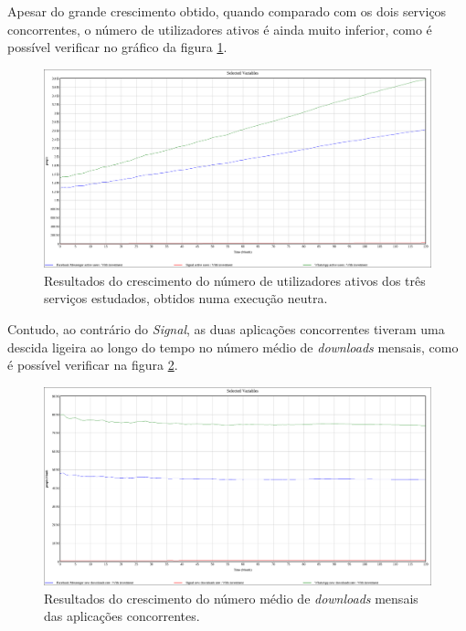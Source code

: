 Apesar do grande crescimento obtido, quando comparado com os dois serviços concorrentes, o número de utilizadores ativos é ainda muito inferior, como é possível verificar no gráfico da figura \ref{model:base_all_model}.

\begin{figure}[H]
   \begin{center}
       \includegraphics[width=17cm]{img/neutral_model_all.png}
       \caption{Resultados do crescimento do número de utilizadores ativos dos três serviços estudados, obtidos numa execução neutra.}
       \label{model:base_all_model}
   \end{center}
\end{figure}

Contudo, ao contrário do \textit{Signal}, as duas aplicações concorrentes tiveram uma descida ligeira ao longo do tempo no número médio de \textit{downloads} mensais, como é possível verificar na figura \ref{model:base_others_model}.

\begin{figure}[H]
   \begin{center}
       \includegraphics[width=17cm]{img/neutral_model_others_download_rate.png}
       \caption{Resultados do crescimento do número médio de \textit{downloads} mensais das aplicações concorrentes.}
       \label{model:base_others_model}
   \end{center}
\end{figure}


